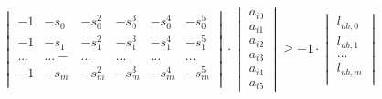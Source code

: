 \documentclass[a4paper,11pt]{article}  %
\begin{document}
$$
\begin{vmatrix} 
 -1 & -s_0 & -s_0^2 & -s_0^3 & -s_0^4&-s_0^5 \\
  -1 & -s_1 & -s_1^2 & -s_1^3 & -s_1^4&-s_1^5 \\
 ...&...-&...&...&...&... \\
 -1 & -s_m & -s_m^2 & -s_m^3 & -s_m^4&-s_m^5 \\
 \end{vmatrix} 
 \cdot 
 \begin{vmatrix} a_{i0} \\ a_{i1} \\ a_{i2} \\ a_{i3} \\ a_{i4} \\ a_{i5}  \end{vmatrix} 
 \geq
 -1 \cdot
 \begin{vmatrix}
 l_{ub,0}\\
 l_{ub,1}\\
 ...\\
 l_{ub,m}\\
 \end{vmatrix}
$$
\end{document}
